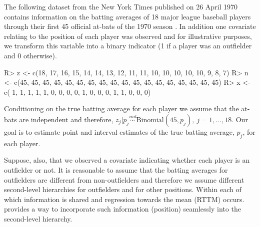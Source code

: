 \documentclass[article]{jss}
\begin{document}
The following dataset from the New York Times published on 26 April 1970 contains information on the batting averages of 18 major league baseball players through their first 45 official at-bats of the 1970 season \citep{1975}. In addition one covariate relating to the position of each player was observed and for illustrative purposes, we transform this variable into a binary indicator (1 if a player was an outfielder and 0 otherwise).
\begin{CodeChunk}
\begin{CodeInput}
R> z <- c(18, 17, 16, 15, 14, 14, 13, 12, 11, 11, 10, 10, 10, 10, 10,  9,  8,  7)
R> n <- c(45, 45, 45, 45, 45, 45, 45, 45, 45, 45, 45, 45, 45, 45, 45, 45, 45, 45)
R> x <- c( 1,  1,  1,  1,  1,  0,  0,  0,  0,  1,  0,  0,  0,  1,  1,  0,  0,  0) 
\end{CodeInput}
\end{CodeChunk}

Conditioning on the true batting average for each player we assume that the at-bats are independent and therefore, $z_{j}\vert p_{j}\stackrel{ind}{\sim} \textrm{Binomial}(45, p_{j}), ~j=1, \ldots, 18$. Our goal is to estimate point and interval estimates of the true batting average, $p_{j}$, for each player. %



Suppose, also, that we observed a covariate indicating whether each player is an outfielder or not. It is reasonable to assume that the batting averages for outfielders are different from non-outfielders and therefore we assume different second-level hierarchies for outfielders and for other positions. Within each of which information is shared and regression towards the mean (RTTM) occurs.  provides a way to incorporate such information (position) seamlessly into the second-level hierarchy.
\end{document}
